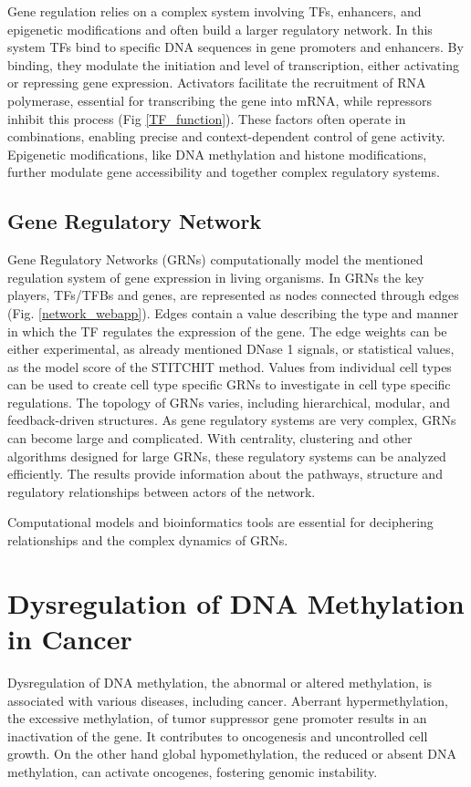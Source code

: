 \documentclass[pdftex,12pt,a4paper]{report}
\begin{document}
Gene regulation relies on a complex system involving TFs, enhancers, and epigenetic modifications and often build a larger regulatory network. In this system TFs bind to specific DNA sequences in gene promoters and enhancers. By binding, they modulate the initiation and level of transcription, either activating or repressing gene expression. Activators facilitate the recruitment of RNA polymerase, essential for transcribing the gene into mRNA, while repressors inhibit this process (Fig \ref{TF_function}). These factors often operate in combinations, enabling precise and context-dependent control of gene activity. Epigenetic modifications, like DNA methylation and histone modifications, further modulate gene accessibility\cite{TFs} and together complex regulatory systems.

\subsection{Gene Regulatory Network}
Gene Regulatory Networks (GRNs) computationally model the mentioned regulation system of gene expression in living organisms\cite{GRN2}. 	
In GRNs the key players, TFs/TFBs and genes, are represented as nodes connected through edges (Fig. \ref{network_webapp}). Edges contain a value describing the type and manner in which the TF regulates the expression of the gene. The edge weights can be either experimental, as already mentioned DNase 1 signals, or statistical values, as the model score of the STITCHIT method. Values from individual cell types can be used to create cell type specific GRNs to investigate in cell type specific regulations. 
The topology of GRNs varies, including hierarchical, modular, and feedback-driven structures. As gene regulatory systems are very complex, GRNs can become large and complicated. With centrality, clustering and other algorithms designed for large GRNs, these regulatory systems can be analyzed efficiently. The results provide information about the pathways, structure and regulatory relationships between actors of the network\cite{GRN3}. 

Computational models and bioinformatics tools are essential for deciphering relationships and the complex dynamics of GRNs. 

\section{Dysregulation of DNA Methylation in Cancer}
Dysregulation of DNA methylation, the abnormal or altered methylation, is associated with various diseases, including cancer. Aberrant hypermethylation, the excessive methylation, of tumor suppressor gene promoter results in an inactivation of the gene. It contributes to oncogenesis and uncontrolled cell growth. On the other hand global hypomethylation, the reduced or absent DNA methylation, can activate oncogenes, fostering genomic instability\cite{MethCancer}.
\end{document}
